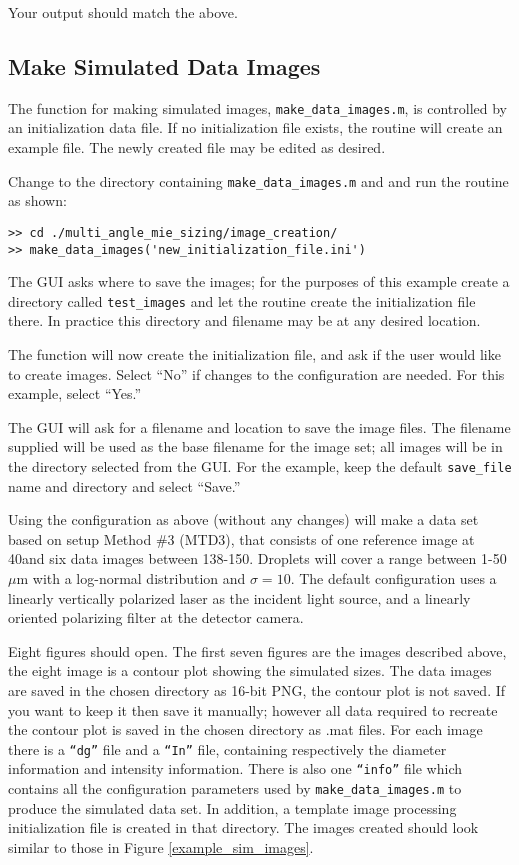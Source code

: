 Your output should match the above.

\subsection{Make Simulated Data Images}

The function for making simulated images, \texttt{make\_data\_images.m}, is controlled by an initialization data file.  If no initialization file exists, the routine will create an example file.  The newly created file may be edited as desired.

Change to the directory containing \texttt{make\_data\_images.m} and and run the routine as shown:
\begin{verbatim}
>> cd ./multi_angle_mie_sizing/image_creation/
>> make_data_images('new_initialization_file.ini')
\end{verbatim}

The GUI asks where to save the images; for the purposes of this example create a directory called \texttt{test\_images} and let the routine create the initialization file there.  In practice this directory and filename may be at any desired location. 

The function will now create the initialization file, and ask if the user would like to create images.  Select ``No'' if changes to the configuration are needed.  For this example, select ``Yes.''

The GUI will ask for a filename and location to save the image files.  The filename supplied will be used as the base filename for the image set; all images will be in the directory selected from the GUI.  For the example, keep the default \texttt{save\_file} name and directory and select ``Save.''

Using the configuration as above (without any changes) will make a data set based on setup Method \#3 (MTD3), that consists of one reference image at 40\textdegree and six data images between 138-150\textdegree.  Droplets will cover a range between 1-50$\mu$m with a log-normal distribution and $\sigma=10$.  The default configuration uses a linearly vertically polarized laser as the incident light source, and a linearly oriented polarizing filter at the detector camera.

Eight figures should open.  The first seven figures are the images described above, the eight image is a contour plot showing the simulated sizes.  The data images are saved in the chosen directory as 16-bit PNG, the contour plot is not saved.  If you want to keep it then save it manually; however all data required to recreate the contour plot is saved in the chosen directory as .mat files. For each image there is a \texttt{``dg''} file and a \texttt{``In''} file, containing respectively the diameter information and intensity information.  There is also one \texttt{``info''} file which contains all the configuration parameters used by \texttt{make\_data\_images.m} to produce the simulated data set.  In addition, a template image processing initialization file is created in that directory.  The images created should look similar to those in Figure \ref{example_sim_images}.


